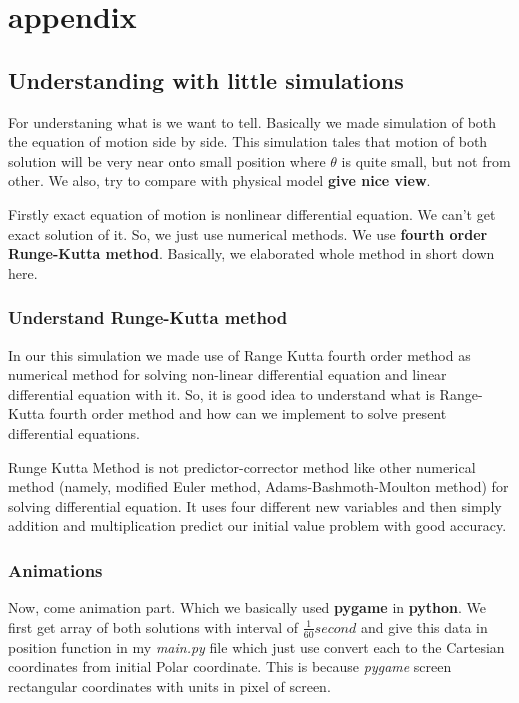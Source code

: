 \documentclass[11pt,a4paper]{article}
\begin{document}
\section{appendix}
\label{sec:orgc6f06c9}
\subsection{Understanding with little simulations}
\label{sec:org7a39735}

For understaning what is we want to tell. Basically we made simulation of both the equation of motion side by side. This simulation tales that motion of both solution will be very near onto small position where \(\theta\) is quite small, but not from other. We also, try to compare with physical model \textbf{give nice view}.

Firstly exact equation of motion is nonlinear differential equation. We can't get exact solution of it. So, we just use numerical methods. We use \textbf{fourth order Runge-Kutta method}. Basically, we elaborated whole method in short down here. 

\subsubsection{Understand Runge-Kutta method}
\label{sec:org7e14d13}

In our this simulation we made use of Range Kutta fourth order method as numerical method for solving non-linear differential equation and linear differential equation with it. So, it is good idea to understand what is Range-Kutta fourth order method and how can we implement to solve present differential equations.

Runge Kutta Method is not predictor-corrector method like other numerical method (namely, modified Euler method, Adams-Bashmoth-Moulton method) for solving differential equation. It uses four different new variables and then simply addition and multiplication predict our initial value problem with good accuracy.






\subsubsection{Animations}
\label{sec:org015bda6}

Now, come animation part. Which we basically used \textbf{pygame} in \textbf{python}. We first get array of both solutions with interval of \(\frac{1}{60} second\) and give this data in position function in my \emph{main.py} file which just use convert each to the Cartesian coordinates from initial Polar coordinate. This is because \emph{pygame} screen rectangular coordinates with units in pixel of screen.
\end{document}
